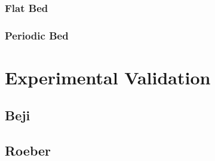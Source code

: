 







\subsubsection{Flat Bed}
\subsubsection{Periodic Bed}


\section{Experimental Validation}

\subsection{Beji}

\subsection{Roeber}


